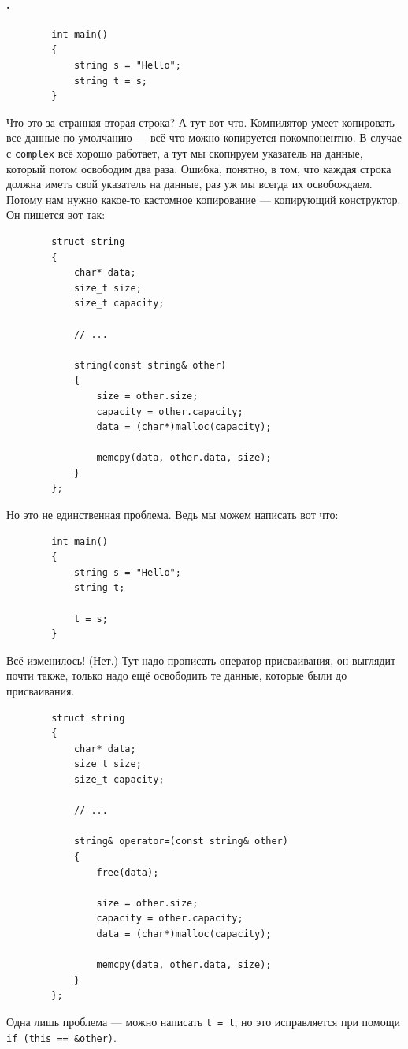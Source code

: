 \documentclass{article}
\begin{document}
    \paragraph{.}
    \begin{verbatim}
        int main()
        {
            string s = "Hello";
            string t = s;
        }
    \end{verbatim}
    Что это за странная вторая строка? А тут вот что. Компилятор умеет копировать все данные по умолчанию --- всё что можно копируется покомпонентно. В случае с \texttt{complex} всё хорошо работает, а тут мы скопируем указатель на данные, который потом освободим два раза. Ошибка, понятно, в том, что каждая строка должна иметь свой указатель на данные, раз уж мы всегда их освобождаем. Потому нам нужно какое-то кастомное копирование --- копирующий конструктор. Он пишется вот так:
    \begin{verbatim}
        struct string
        {
            char* data;
            size_t size;
            size_t capacity;

            // ...

            string(const string& other)
            {
                size = other.size;
                capacity = other.capacity;
                data = (char*)malloc(capacity);

                memcpy(data, other.data, size);
            }
        };
    \end{verbatim}
    Но это не единственная проблема. Ведь мы можем написать вот что:
    \begin{verbatim}
        int main()
        {
            string s = "Hello";
            string t;

            t = s;
        }
    \end{verbatim}
    Всё изменилось! (Нет.) Тут надо прописать оператор присваивания, он выглядит почти также, только надо ещё освободить те данные, которые были до присваивания.
    \begin{verbatim}
        struct string
        {
            char* data;
            size_t size;
            size_t capacity;
            
            // ...
            
            string& operator=(const string& other)
            {
                free(data);

                size = other.size;
                capacity = other.capacity;
                data = (char*)malloc(capacity);
                
                memcpy(data, other.data, size);
            }
        };
    \end{verbatim}
    Одна лишь проблема --- можно написать \texttt{t = t}, но это исправляется при помощи \texttt{if (this == &other)}.
\end{document}
